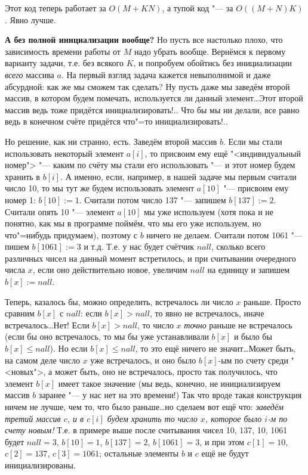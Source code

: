 Этот код теперь работает за $O(M+KN)$, а тупой код "--- за $O((M+N)K)$. Явно лучше.

\textbf{А без полной инициализации вообще?} Но пусть все настолько плохо, что зависимость времени работы от 
$M$ надо убрать вообще. Вернёмся к первому варианту задачи, т.е. без всякого $K$, и попробуем 
обойтись без инициализации \textit{всего} массива $a$. На первый взгляд задача кажется невыполнимой 
и даже абсурдной: как же мы сможем так сделать? Ну пусть даже мы заведём второй массив, в котором 
будем помечать, используется ли данный элемент\dots Этот второй массив ведь тоже придётся 
инициализировать!.. Что бы мы ни делали, все равно ведь в конечном счёте придётся что"=то 
инициализировать!..

Но решение, как ни странно, есть. Заведём второй массив $b$. Если мы стали использовать некоторый 
элемент $a[i]$, то присвоим ему ещё "<индивидуальный номер"> "--- каким по счёту мы стали его 
использовать "--- и этот номер будем хранить в $b[i]$. А именно, если, например, в нашей задаче мы первым считали число 10, то мы тут же 
будем использовать элемент $a[10]$ "--- присвоим ему номер 1: $b[10]:=1$. Считали потом число 137 
"--- запишем $b[137]:=2$. Считали опять 10 "--- элемент $a[10]$ мы уже используем (хотя пока и не 
понятно, как мы в программе поймём, что мы его уже используем, но что"=нибудь придумаем), поэтому с 
$b$ ничего не делаем. Считали потом 1061 "--- пишем 
$b[1061]:=3$ и т.д. Т.е. у нас будет счётчик $nall$, сколько всего различных чисел на данный момент 
встретилось, и при считывании очередного числа $x$, если оно действительно новое, увеличим $nall$ 
на единицу и запишем $b[x]:=nall$.

Теперь, казалось бы, можно определить, встречалось ли число $x$ раньше. Просто сравним $b[x]$ с 
$nall$: если $b[x]>nall$, то явно не встречалось, иначе встречалось\dots Нет! Если $b[x]>nall$, то 
число $x$ \textit{точно} раньше не встречалось (если бы оно встречалось, то мы бы уже устанавливали
$b[x]$ и было бы $b[x]\leq nall$). Но если $b[x]\leq nall$, то это ещё ничего не значит\dots Может быть, на самом деле число 
$x$ уже встречалось, и оно было $b[x]$-ым по счету среди "<новых">, а может быть, оно не 
встречалось, просто так получилось, что элемент $b[x]$ имеет такое значение (мы ведь, конечно, не 
инициализируем массив $b$ заранее "--- у нас нет на это времени!) Так что вроде такая конструкция ничем не 
лучше, чем то, что было раньше\dots но сделаем вот ещё что: \textit{заведём третий массив $c$, и в 
$c[i]$ будем хранить то число $x$, которое было $i$-м по счету новым!} Т.е. в примере выше после 
считывания чисел 10, 137, 10, 1061 будет $nall=3$, $b[10]=1$, $b[137]=2$, $b[1061]=3$, и при этом 
$c[1]=10$, $c[2]=137$, $c[3]=1061$; остальные элементы $b$ и $c$ ещё не будут инициализированы. 

